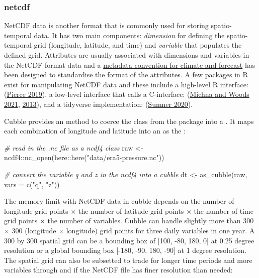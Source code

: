 \documentclass{article}
\newenvironment{Shaded}{\begin{snugshade}}{\end{snugshade}}
\newcommand{\AttributeTok}[1]{\textcolor[rgb]{0.77,0.63,0.00}{#1}}
\newcommand{\CommentTok}[1]{\textcolor[rgb]{0.56,0.35,0.01}{\textit{#1}}}
\newcommand{\FunctionTok}[1]{\textcolor[rgb]{0.00,0.00,0.00}{#1}}
\newcommand{\NormalTok}[1]{#1}
\newcommand{\OtherTok}[1]{\textcolor[rgb]{0.56,0.35,0.01}{#1}}
\newcommand{\SpecialCharTok}[1]{\textcolor[rgb]{0.00,0.00,0.00}{#1}}
\newcommand{\StringTok}[1]{\textcolor[rgb]{0.31,0.60,0.02}{#1}}
\begin{document}
\hypertarget{netcdf}{%
\subsubsection{netcdf}\label{netcdf}}

NetCDF data is another format that is commonly used for storing spatio-temporal data. It has two main components: \emph{dimension} for defining the spatio-temporal grid (longitude, latitude, and time) and \emph{variable} that populates the defined grid. Attributes are usually associated with dimensions and variables in the NetCDF format data and a \href{http://cfconventions.org/}{metadata convention for climate and forecast} has been designed to standardise the format of the attributes. A few packages in R exist for manipulating NetCDF data and these include a high-level R interface:  (\protect\hyperlink{ref-ncdf4}{Pierce 2019}), a low-level interface that calls a C-interface:  (\protect\hyperlink{ref-rnetcdf}{Michna and Woods 2021}, \protect\hyperlink{ref-michna2013rnetcdf}{2013}), and a tidyverse implementation:  (\protect\hyperlink{ref-tidync}{Sumner 2020}).

Cubble provides an  method to coerce the  class from the  package into a . It maps each combination of longitude and latitude into an  as the :

\begin{Shaded}
\begin{Highlighting}[]
\CommentTok{\# read in the .nc file as a ncdf4 class}
\NormalTok{raw }\OtherTok{\textless{}{-}}\NormalTok{ ncdf4}\SpecialCharTok{::}\FunctionTok{nc\_open}\NormalTok{(here}\SpecialCharTok{::}\FunctionTok{here}\NormalTok{(}\StringTok{"data/era5{-}pressure.nc"}\NormalTok{))}

\CommentTok{\# convert the variable q and z in the ncdf4 into a cubble}
\NormalTok{dt }\OtherTok{\textless{}{-}} \FunctionTok{as\_cubble}\NormalTok{(raw, }\AttributeTok{vars =} \FunctionTok{c}\NormalTok{(}\StringTok{"q"}\NormalTok{, }\StringTok{"z"}\NormalTok{))}
\end{Highlighting}
\end{Shaded}

The memory limit with NetCDF data in cubble depends on the number of longitude grid points \(\times\) the number of latitude grid points \(\times\) the number of time grid points \(\times\) the number of variables. Cubble can handle slightly more than 300 \(\times\) 300 (longitude \(\times\) longitude) grid points for three daily variables in one year. A 300 by 300 spatial grid can be a bounding box of {[}100, -80, 180, 0{]} at 0.25 degree resolution or a global bounding box {[}-180, -90, 180, -90{]} at 1 degree resolution. The spatial grid can also be subsetted to trade for longer time periods and more variables through  and  if the NetCDF file has finer resolution than needed:
\end{document}
